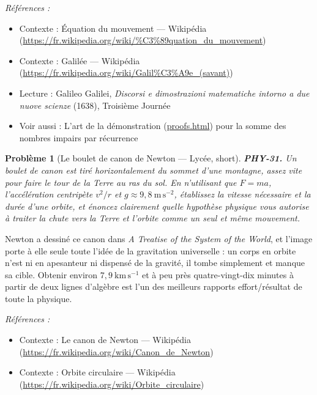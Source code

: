 \documentclass[11pt]{article}
\newtheorem{problem}{Problème}
\newenvironment{refs}{\par\small\noindent\emph{Références :}\begin{itemize}\setlength\itemsep{0pt}}{\end{itemize}\normalsize}
\begin{document}
\begin{refs}
\item Contexte : Équation du mouvement --- Wikipédia (\url{https://fr.wikipedia.org/wiki/%C3%89quation_du_mouvement})
\item Contexte : Galilée --- Wikipédia (\url{https://fr.wikipedia.org/wiki/Galil%C3%A9e_(savant)})
\item Lecture : Galileo Galilei, \textit{Discorsi e dimostrazioni matematiche intorno a due nuove scienze} (1638), Troisième Journée
\item Voir aussi : L'art de la démonstration (\url{proofs.html}) pour la somme des nombres impairs par récurrence
\end{refs}

\bigskip

\begin{problem}[{Le boulet de canon de Newton --- Lycée, short}]
\textbf{PHY-31.} Un boulet de canon est tiré horizontalement du sommet d'une
montagne, assez vite pour faire le tour de la Terre au ras du sol. En n'utilisant que
$ F = ma $, l'accélération centripète $ v^{2}/r $ et $ g \approx 9{,}8\ \mathrm{m\,s^{-2}} $,
établissez la vitesse nécessaire et la durée d'une orbite, et énoncez clairement quelle hypothèse
physique vous autorise à traiter la chute vers la Terre et l'orbite comme un seul et même
mouvement.
\end{problem}

\noindent Newton a dessiné ce canon dans \textit{A Treatise of the System of the World},
et l'image porte à elle seule toute l'idée de la gravitation universelle : un corps en orbite
n'est ni en apesanteur ni dispensé de la gravité, il tombe simplement et manque sa cible. Obtenir
environ $ 7{,}9\ \mathrm{km\,s^{-1}} $ et à peu près quatre-vingt-dix minutes à partir de deux
lignes d'algèbre est l'un des meilleurs rapports effort/résultat de toute la physique.

\begin{refs}
\item Contexte : Le canon de Newton --- Wikipédia (\url{https://fr.wikipedia.org/wiki/Canon_de_Newton})
\item Contexte : Orbite circulaire --- Wikipédia (\url{https://fr.wikipedia.org/wiki/Orbite_circulaire})
\end{refs}

\bigskip
\end{document}
